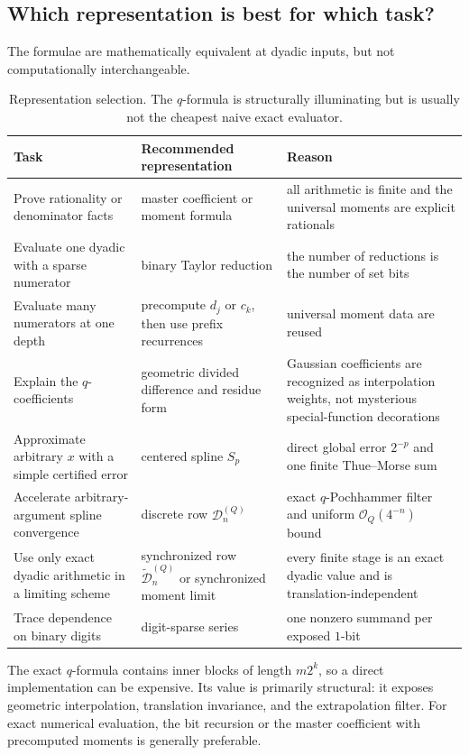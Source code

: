 \documentclass[11pt,oneside]{article}
\theoremstyle{definition}
\theoremstyle{remark}
\newcommand{\bigO}{\mathcal O}
\begin{document}
\subsection{Which representation is best for which task?}

The formulae are mathematically equivalent at dyadic inputs, but not computationally
interchangeable.

\begin{table}[ht]
\centering
\small
\begin{tabularx}{\textwidth}{@{}p{}p{}X@{}}
\toprule
Task & Recommended representation & Reason \\
\midrule
Prove rationality or denominator facts & master coefficient or moment formula & all arithmetic is finite and the universal moments are explicit rationals \\
Evaluate one dyadic with a sparse numerator & binary Taylor reduction & the number of reductions is the number of set bits \\
Evaluate many numerators at one depth & precompute $d_j$ or $c_k$, then use prefix recurrences & universal moment data are reused \\
Explain the $q$-coefficients & geometric divided difference and residue form & Gaussian coefficients are recognized as interpolation weights, not mysterious special-function decorations \\
Approximate arbitrary $x$ with a simple certified error & centered spline $S_p$ & direct global error $2^{-p}$ and one finite Thue--Morse sum \\
Accelerate arbitrary-argument spline convergence & discrete row $\mathcal D_n^{(Q)}$ & exact $q$-Pochhammer filter and uniform $\bigO_Q(4^{-n})$ bound \\
Use only exact dyadic arithmetic in a limiting scheme & synchronized row $\widetilde{\mathcal D}_n^{(Q)}$ or synchronized moment limit & every finite stage is an exact dyadic value and is translation-independent \\
Trace dependence on binary digits & digit-sparse series & one nonzero summand per exposed $1$-bit \\
\bottomrule
\end{tabularx}
\caption{Representation selection.  The $q$-formula is structurally illuminating but is
usually not the cheapest naive exact evaluator.}
\label{dyadicweb:tab:representation-selection}
\end{table}

The exact $q$-formula contains inner blocks of length $m2^k$, so a direct implementation can
be expensive.  Its value is primarily structural: it exposes geometric interpolation,
translation invariance, and the extrapolation filter.  For exact numerical evaluation, the
bit recursion or the master coefficient with precomputed moments is generally preferable.
\end{document}

